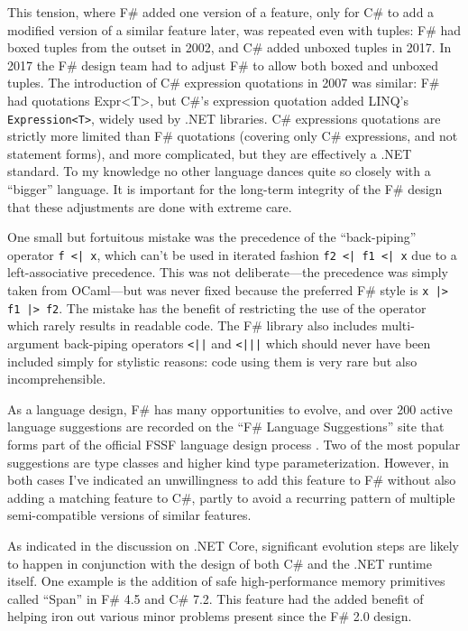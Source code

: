 \documentclass[acmsmall,screen]{acmart}
\begin{document}
This tension, where F\# added one version of a feature, only for C\# to add a modified version of a similar
feature later, was repeated even with tuples: F\# had boxed tuples from the outset in 2002,
and C\# added unboxed tuples in 2017.  In 2017 the F\# design team had to
adjust F\# to allow both boxed and unboxed tuples. The introduction of C\# expression quotations in
2007 was similar: F\# had quotations Expr<T>, but C\#’s expression quotation added
LINQ’s \texttt{Expression<T>}, widely used by .NET libraries. C\# expressions quotations are strictly
more limited than F\# quotations (covering only C\# expressions, and not statement forms), and
more complicated, but they are effectively a .NET standard.  To my knowledge no other language
dances quite so closely with a “bigger” language. It is important for the long-term integrity of the F\# design
that these adjustments are done with extreme care.

One small but fortuitous mistake was the precedence of the “back-piping”
operator \verb$f <| x$, which can’t be used in iterated fashion \verb$f2 <| f1 <| x$ due to
a left-associative precedence. This was not deliberate---the precedence was simply
taken from OCaml---but was never fixed because the preferred F\# style is  \verb$x |> f1 |> f2$. The
mistake has the benefit of restricting the use of the operator which rarely results in readable code. The F\# library also includes
multi-argument back-piping operators \verb$<||$ and \verb$<|||$ which should never have been included simply for
stylistic reasons: code using them is very rare but also incomprehensible.

As a language design, F\# has many opportunities to evolve, and over 200 active language
suggestions are recorded on the “F\# Language Suggestions” site that forms part of the
official FSSF language design process \citep{RefLangSuggestions}.
Two of the most popular suggestions are type classes
and higher kind type parameterization. However, in both cases I’ve indicated an unwillingness
to add this feature to F\# without also adding a matching feature to C\#, partly to avoid a
recurring pattern of multiple semi-compatible versions of similar features.

As indicated in the discussion on .NET Core, significant evolution steps are likely to happen in
conjunction with the design of both C\# and the .NET runtime itself.  One example is the addition
of safe high-performance memory primitives called “Span” in F\# 4.5 and C\# 7.2.  This feature
had the added benefit of helping iron out various minor problems present since the F\# 2.0 design.
\end{document}
